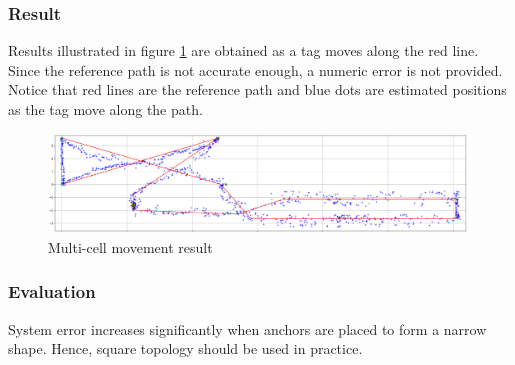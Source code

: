 \documentclass[\main/thesis.tex]{subfiles}
\begin{document}
\subsubsection{Result}

Results illustrated in figure \ref{fig:multi_cell_movement_result} are obtained as a tag moves along the red line. Since the reference path is not accurate enough, a numeric error is not provided. Notice that red lines are the reference path and blue dots are estimated positions as the tag move along the path.
\begin{figure}[H]
    \centering
    \includegraphics[width=1\textwidth]{path.png}
    \caption{Multi-cell movement result}
    \label{fig:multi_cell_movement_result}
\end{figure}
\subsubsection{Evaluation}
System error increases significantly when anchors are placed to form a narrow shape. Hence, square topology should be used in practice.
\end{document}
